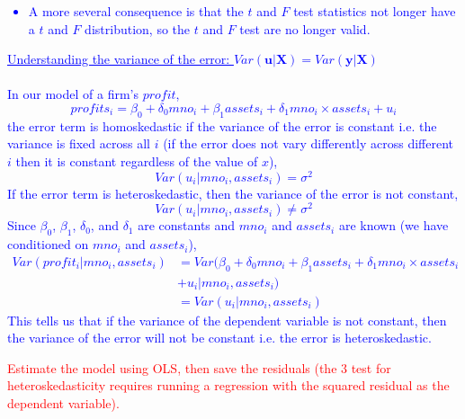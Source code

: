 \documentclass[12pt]{report}
\newenvironment{blueframed}[1][blue]
{\def\FrameCommand{\fboxsep=\FrameSep\fcolorbox{#1}{white}}%
\MakeFramed {\advance\hsize-\width \FrameRestore}}
{\endMakeFramed}
\begin{document}
\begin{blueframed}
	\noindent \textcolor{blue}
	{
		\begin{itemize}
			\item A more several consequence is that the $t$ and $F$ test statistics not longer have a $t$ and $F$ distribution, so the $t$ and $F$ test are no longer valid.
		\end{itemize}
		\uline{Understanding the variance of the error: $Var(\boldsymbol{u}|\boldsymbol{X}) = Var(\boldsymbol{y}|\boldsymbol{X})$} \\ \\ In our model of a firm's $profit$, $$profits_i = \beta_0 + \delta_0mno_i + \beta_1assets_i + \delta_1 mno_i \times assets_i + u_i$$ the error term is homoskedastic if the variance of the error is constant i.e. the variance is fixed across all $i$ (if the error does not vary differently across different $i$ then it is constant regardless of the value of $x$), $$Var(u_i|mno_i,assets_i) = \sigma^2$$ If the error term is heteroskedastic, then the variance of the error is not constant, $$Var(u_i|mno_i,assets_i) \neq \sigma^2$$ 
		Since $\beta_0$, $\beta_1$, $\delta_0$, and $\delta_1$ are constants and $mno_i$ and $assets_i$ are known (we have conditioned on $mno_i$ and $assets_i$),
		\begin{align*}
		Var(profit_i|mno_i,assets_i) &= Var(\beta_0 + \delta_0mno_i + \beta_1assets_i + \delta_1 mno_i \times assets_i \\ &+ u_i|mno_i,assets_i) \\ 
		&= Var(u_i|mno_i,assets_i)
		\end{align*}
		This tells us that if the variance of the dependent variable is not constant, then the variance of the error will not be constant i.e. the error is heteroskedastic.
	}
\end{blueframed}


\noindent \textcolor{red}{Estimate the model using OLS, then save the residuals (the 3 test for heteroskedasticity requires running a regression with the squared residual as the dependent variable).}
\end{document}
